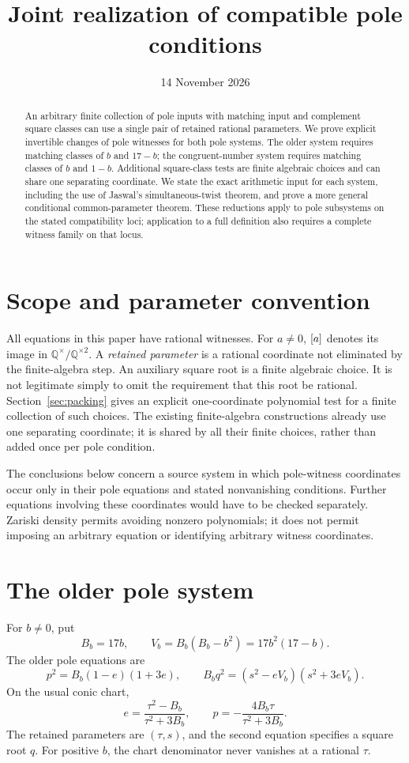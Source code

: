 \documentclass[11pt,a4paper]{article}
\title{Joint realization of compatible pole conditions}
\author{}\date{14 November 2026}
\theoremstyle{definition}\newtheorem{definition}[theorem]{Definition}
\theoremstyle{remark}\newtheorem{remark}[theorem]{Remark}
\newcommand{\Q}{\mathbb Q}\newcommand{\Z}{\mathbb Z}
\begin{document}
\maketitle
\begin{abstract}
An arbitrary finite collection of pole inputs with matching input and
complement square classes can use a single pair of retained rational
parameters. We prove explicit invertible changes of pole witnesses for
both pole systems. The older system requires matching classes of $b$
and $17-b$; the congruent-number system requires matching classes of
$b$ and $1-b$. Additional square-class tests are finite algebraic
choices and can share one separating coordinate. We state the exact
arithmetic input for each system, including the use of Jaswal's
simultaneous-twist theorem, and prove a more general conditional
common-parameter theorem. These reductions apply to pole subsystems
on the stated compatibility loci; application to a full definition
also requires a complete witness family on that locus.
\end{abstract}

\section{Scope and parameter convention}
All equations in this paper have rational witnesses. For $a\ne0$,
$[a]$ denotes its image in $\Q^\times/\Q^{\times2}$.
A \emph{retained parameter} is a rational coordinate not eliminated by
the finite-algebra step. An auxiliary square root is a finite algebraic
choice. It is not legitimate simply to omit the requirement that this
root be rational. Section~\ref{sec:packing} gives an explicit
one-coordinate polynomial test for a finite collection of such choices.
The existing finite-algebra constructions already use one separating
coordinate; it is shared by all their finite choices, rather than added
once per pole condition.

The conclusions below concern a source system in which pole-witness
coordinates occur only in their pole equations and stated nonvanishing
conditions. Further equations involving these coordinates would have to
be checked separately. Zariski density permits avoiding nonzero
polynomials; it does not permit imposing an arbitrary equation or
identifying arbitrary witness coordinates.

\section{The older pole system}
For $b\ne0$, put
\[
 B_b=17b,\qquad V_b=B_b(B_b-b^2)=17b^2(17-b).
\]
The older pole equations are
\begin{equation}\label{eq:old}
 p^2=B_b(1-e)(1+3e),\qquad
 B_bq^2=(s^2-eV_b)(s^2+3eV_b).
\end{equation}
On the usual conic chart,
\begin{equation}\label{eq:chart}
 e=\frac{\tau^2-B_b}{\tau^2+3B_b},\qquad
 p=-\frac{4B_b\tau}{\tau^2+3B_b}.
\end{equation}
The retained parameters are $(\tau,s)$, and the second equation specifies
a square root $q$. For positive $b$, the chart denominator never
vanishes at a rational $\tau$.
\end{document}
